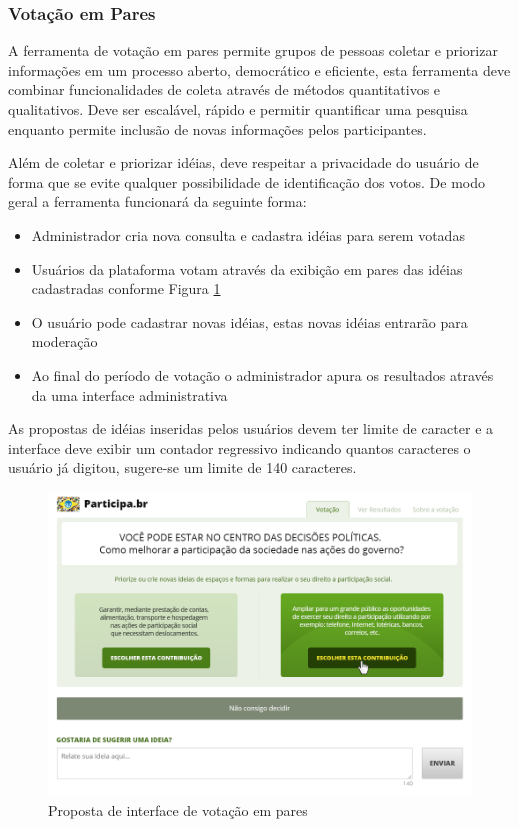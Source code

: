 \documentclass[12pt]{article}
\begin{document}
\subsubsection{Votação em Pares}

A ferramenta de votação em pares permite grupos de pessoas coletar e priorizar
informações em um processo aberto, democrático e eficiente, esta ferramenta
deve combinar funcionalidades de coleta através de métodos quantitativos e
qualitativos. Deve ser escalável, rápido e permitir quantificar uma pesquisa
enquanto permite inclusão de novas informações pelos participantes.

Além de coletar e priorizar idéias, deve respeitar a privacidade do usuário de
forma que se evite qualquer possibilidade de identificação dos votos. De modo
geral a ferramenta funcionará da seguinte forma:

\begin{itemize}
  \item Administrador cria nova consulta e cadastra idéias para serem votadas
  \item Usuários da plataforma votam através da exibição em pares das
    idéias cadastradas conforme Figura \ref{fig:pairwise}
  \item O usuário pode cadastrar novas idéias, estas novas idéias entrarão
    para moderação
  \item Ao final do período de votação o administrador apura os resultados
    através da uma interface administrativa
\end{itemize}

As propostas de idéias inseridas pelos usuários devem ter limite de caracter e
a interface deve exibir um contador regressivo indicando quantos caracteres o
usuário já digitou, sugere-se um limite de 140 caracteres.

\begin{figure}[h]
\center
\includegraphics[scale=0.4]{design-votacao-em-pares-verde.png}
\caption{Proposta de interface de votação em pares}
\label{fig:pairwise}
\end{figure}
\end{document}
